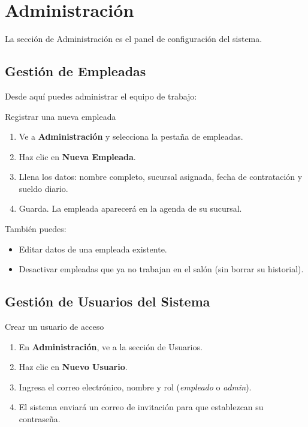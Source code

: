 \documentclass[12pt,a4paper]{article}
\begin{document}
\newpage
\section{Administración}

La sección de Administración es el panel de configuración del sistema.

\subsection{Gestión de Empleadas}

Desde aquí puedes administrar el equipo de trabajo:

\begin{pasobox}{Registrar una nueva empleada}
\begin{enumerate}[leftmargin=*]
  \item Ve a \textbf{Administración} y selecciona la pestaña de empleadas.
  \item Haz clic en \textbf{Nueva Empleada}.
  \item Llena los datos: nombre completo, sucursal asignada, fecha de contratación y sueldo diario.
  \item Guarda. La empleada aparecerá en la agenda de su sucursal.
\end{enumerate}
\end{pasobox}

También puedes:
\begin{itemize}[leftmargin=*]
  \item Editar datos de una empleada existente.
  \item Desactivar empleadas que ya no trabajan en el salón (sin borrar su historial).
\end{itemize}

\subsection{Gestión de Usuarios del Sistema}

\begin{pasobox}{Crear un usuario de acceso}
\begin{enumerate}[leftmargin=*]
  \item En \textbf{Administración}, ve a la sección de Usuarios.
  \item Haz clic en \textbf{Nuevo Usuario}.
  \item Ingresa el correo electrónico, nombre y rol (\textit{empleado} o \textit{admin}).
  \item El sistema enviará un correo de invitación para que establezcan su contraseña.
\end{enumerate}
\end{pasobox}
\end{document}
